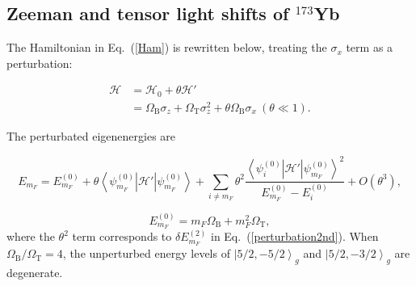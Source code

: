 \documentclass[pdflatex,sn-nature,centre]{sn-jnl}%
\begin{document}
\subsection* {Zeeman and tensor light shifts of $^{173}$Yb}\label{CombinedShift}


The Hamiltonian in Eq.~(\ref{Ham}) is rewritten below, treating the $\sigma_x$ term as a perturbation:

\begin{equation}\label{Ham_pur}
\begin{aligned}
    \mathscr H & = \mathscr{H}_0+\theta\mathscr{H}' \\
    & = \Omega_{\mathrm B}\sigma_z + \Omega_{\mathrm T}\sigma_z^2 + \theta\Omega_{\mathrm B}\sigma_x\ (\theta\ll 1).
\end{aligned}
\end{equation}

The perturbated eigenenergies are

\begin{equation}\label{perturbation}
    E_{m_F} = E_{m_F}^{(0)}
     +\theta\left\langle \psi_{m_F}^{(0)}\right\vert\mathscr{H}'\left\vert\psi_{m_F}^{(0)}\right\rangle
    +\sum_{i\neq {m_F}}\theta^2    \dfrac{{\left\langle\psi_i^{(0)}\right\vert\mathscr{H}'\left\vert\psi_{m_F}^{(0)} \right\rangle}^2}
    {E_{m_F}^{(0)}-E_i^{(0)}}
    +O(\theta^3),
\end{equation}

\begin{equation}\label{E(0)}
    E_{m_F}^{(0)}=m_F\Omega_{\mathrm B}+m_F^2\Omega_{\mathrm T},
\end{equation}
where the $\theta^2$ term corresponds to $\delta E_{m_F}^{(2)}$ in Eq.~(\ref{perturbation2nd}). When $\Omega_{\mathrm B}/\Omega_{\mathrm T}=4$, the unperturbed energy levels of $\left\vert5/2,-5/2\right\rangle_g$ and $\left\vert5/2,-3/2\right\rangle_g$ are degenerate.
\end{document}

